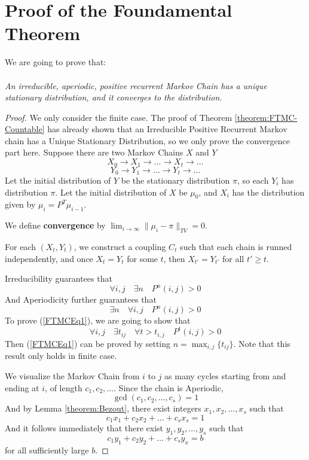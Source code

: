 \section{Proof of the Foundamental Theorem}
    We are going to prove that:
    \paragraph{}
        \emph{An irreducible, aperiodic, positive recurrent Markov Chain has a unique stationary distribution, and it converges to the distribution.}

    \begin{proof}
        We only consider the finite case. The proof of Theorem \ref{theorem:FTMC-Countable} has already shown that an Irreducible Positive Recurrent Markov chain has a Unique Stationary Distribution, so we only prove the convergence part here. Suppose there are two Markov Chains $X$ and $Y$
        \[ X_0 \to X_1 \to \dots \to X_t \to \dots \]
        \[ Y_0 \to Y_1 \to \dots \to Y_t \to \dots \]
        Let the initial distribution of $Y$ be the stationary distribution $\pi$, so each $Y_i$ has distribution $\pi$. Let the initial distribution of $X$ be $\mu_0$, and $X_i$ has the distribution given by $\mu_{i} = P^T\mu_{i-1}$.

        We define \textbf{convergence} by $\lim_{i\to\infty}\|\mu_{i} - \pi\|_{TV} = 0$.

        For each $(X_t, Y_t)$, we construct a coupling $C_t$ such that each chain is runned independently, and once $X_t = Y_t$ for some $t$, then $X_{t'} = Y_{t'}$ for all $t' \ge t$.

        Irreducibility guarantees that 
        \[ \forall i,j \quad \exists n \quad P^n(i,j) > 0 \]
        And Aperiodicity further guarantees that
        \begin{equation}\label{FTMCEq1}
            \exists n \quad \forall i,j \quad P^n(i,j) > 0
        \end{equation}
        To prove (\ref{FTMCEq1}), we are going to show that
        \begin{equation}\label{FTMCEq2}
            \forall i,j \quad \exists t_{ij} \quad \forall t>t_{i,j} \quad P^t(i,j) > 0
        \end{equation}
        Then (\ref{FTMCEq1}) can be proved by setting $n = \max_{i,j}\{t_{ij}\}$. Note that this result only holds in finite case.

        We visualize the Markov Chain from $i$ to $j$ as many cycles starting from and ending at $i$, of length $c_1,c_2,\dots$. Since the chain is Aperiodic,
        \[ \gcd(c_1, c_2,\dots,c_s) = 1 \]
        And by Lemma \ref{theorem:Bezout}, there exist integers $x_1,x_2,\dots,x_s$ such that
        \[ c_1x_1 + c_2x_2 + \dots + c_sx_s = 1 \]
        And it follows immediately that there exist $y_1,y_2,\dots,y_s$ such that
        \[ c_1y_1 + c_2y_2 + \dots + c_sy_x = b \]
        for all sufficiently large $b$.


\end{proof}
